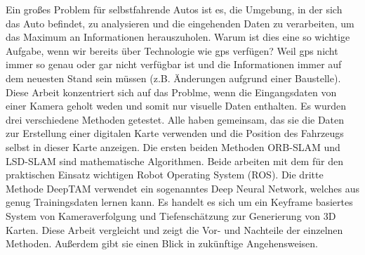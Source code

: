 Ein großes Problem für selbstfahrende Autos ist es, die Umgebung, in der sich das Auto befindet, zu analysieren und die eingehenden Daten zu verarbeiten, um das Maximum an Informationen herauszuholen.  Warum ist dies eine so wichtige Aufgabe, wenn wir bereits über Technologie wie \gls{gps} verfügen? Weil \gls{gps} nicht immer so genau oder gar nicht verfügbar ist und die Informationen immer auf dem neuesten Stand sein müssen (z.B. Änderungen aufgrund einer Baustelle). Diese Arbeit konzentriert sich auf das Problme, wenn die Eingangsdaten von einer Kamera geholt weden und somit nur visuelle Daten enthalten. Es wurden drei verschiedene Methoden getestet. Alle haben gemeinsam, das sie die Daten zur Erstellung einer digitalen Karte verwenden und die Position des Fahrzeugs selbst in dieser Karte anzeigen. Die ersten beiden Methoden ORB-SLAM und LSD-SLAM sind mathematische Algorithmen. Beide arbeiten mit dem für den praktischen Einsatz wichtigen Robot Operating System (ROS). Die dritte Methode DeepTAM verwendet ein sogenanntes Deep Neural Network, welches aus genug Trainingsdaten lernen kann. Es handelt es sich um ein Keyframe basiertes System von Kameraverfolgung und Tiefenschätzung zur Generierung von 3D Karten. Diese Arbeit vergleicht und zeigt die Vor- und Nachteile der einzelnen Methoden. Außerdem gibt sie einen Blick in zukünftige Angehensweisen.
 

